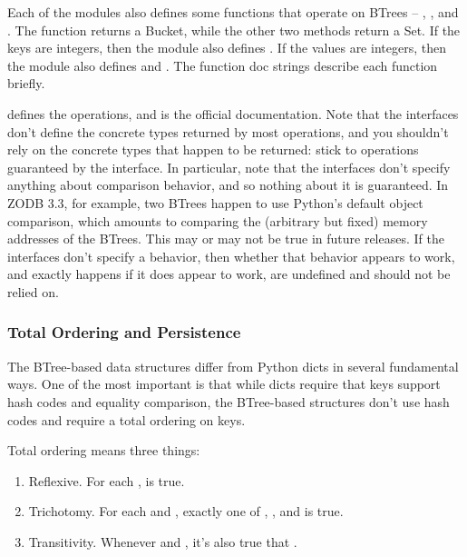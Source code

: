 Each of the modules also defines some functions that operate on
BTrees -- , , and
.  The  function returns
a Bucket, while the other two methods return a Set.
If the keys are integers, then the module also defines
.  If the values are integers, then the module
also defines  and
.  The function doc strings describe each
function briefly.

 defines the operations, and is the official
documentation.  Note that the interfaces don't define the concrete types
returned by most operations, and you shouldn't rely on the concrete types
that happen to be returned:  stick to operations guaranteed by the
interface.  In particular, note that the interfaces don't specify anything
about comparison behavior, and so nothing about it is guaranteed.  In ZODB
3.3, for example, two BTrees happen to use Python's default object
comparison, which amounts to comparing the (arbitrary but fixed) memory
addresses of the BTrees. This may or may not be true in future releases.
If the interfaces don't specify a behavior, then whether that behavior
appears to work, and exactly happens if it does appear to work, are
undefined and should not be relied on.

\subsubsection{Total Ordering and Persistence}

The BTree-based data structures differ from Python dicts in several
fundamental ways.  One of the most important is that while dicts
require that keys support hash codes and equality comparison,
the BTree-based structures don't use hash codes and require a total
ordering on keys.

Total ordering means three things:

\begin{enumerate}
\item  Reflexive.  For each ,  is true.

\item  Trichotomy.  For each  and , exactly one of
       , , and
        is true.

\item  Transitivity.  Whenever  and
       , it's also true that
       .
\end{enumerate}

